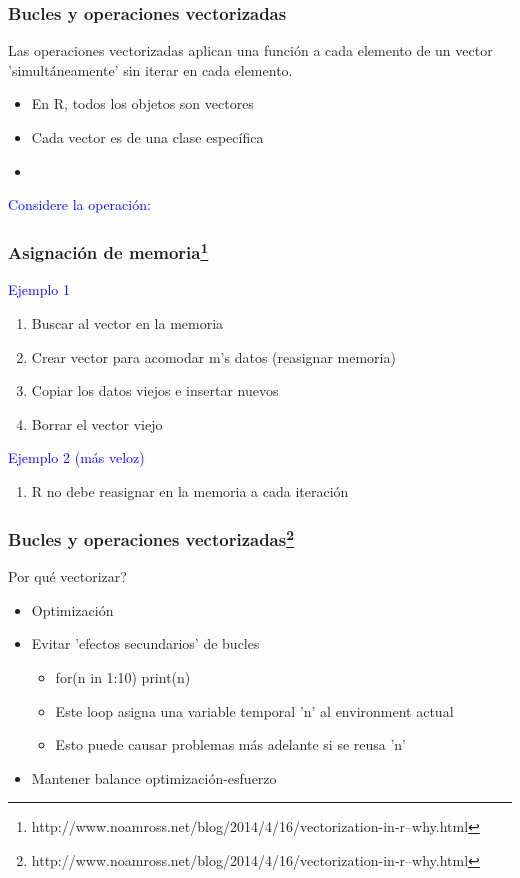 \documentclass{beamer}
\begin{document}
 \begin{frame}
 \frametitle{Bucles y operaciones vectorizadas}
 Las operaciones vectorizadas aplican una funci\'on a cada elemento de un vector 'simult\'aneamente' sin iterar en cada elemento.
      \begin{itemize}
 	    \item En R, todos los objetos son vectores
 	    \item Cada vector es de una clase espec\'ifica
 	    \item []
  	   \end{itemize}
  	   \textcolor{blue}{Considere la operaci\'on:}
  	   \lst
\end{frame}


 \begin{frame}
 \frametitle{Asignaci\'on de memoria\footnote{http://www.noamross.net/blog/2014/4/16/vectorization-in-r--why.html}}
\textcolor{blue}{Ejemplo 1}
      \begin{enumerate}
 	    \item Buscar al vector en la memoria
 	    \item Crear vector para acomodar m\a's datos (reasignar memoria)
 	    \item Copiar los datos viejos e insertar nuevos
 	    \item Borrar el vector viejo
  	   \end{enumerate}
 \textcolor{blue}{Ejemplo 2 (m\'as veloz)}
 \begin{enumerate}
  \item R no debe reasignar en la memoria a cada iteraci\'on
 \end{enumerate}
  	   \lst
\end{frame}

 \begin{frame}
 \frametitle{Bucles y operaciones vectorizadas\footnote{http://www.noamross.net/blog/2014/4/16/vectorization-in-r--why.html}}
Por qu\'e vectorizar?
      \begin{itemize}
 	    \item Optimizaci\'on
 	    \item Evitar 'efectos secundarios' de bucles
 	    \begin{itemize}
 	     \item for(n in 1:10) print(n)
 	     \item Este loop asigna una variable temporal 'n' al environment actual 
 	     \item Esto puede causar problemas m\'as adelante si se reusa 'n'
 	    \end{itemize}
 	    \item Mantener balance optimizaci\'on-esfuerzo
  	   \end{itemize}
\end{frame}
\end{document}
